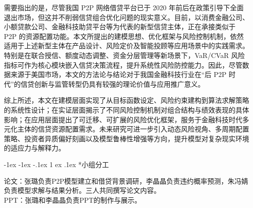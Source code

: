 \documentclass{write_paper}
\makeatletter
\renewcommand\section{\@startsection {section}{1}{\z@}%
                                   {-1ex \@plus -1ex \@minus -.1ex}%
                                   {1 ex \@plus.1ex}%
                                   {\normalfont\large\bfseries}}
\makeatother
\begin{document}
需要指出的是，尽管我国 P2P 网络借贷平台已于 2020 年前后在政策引导下全面退出市场，但这并不削弱信贷组合优化问题的现实意义。目前，以消费金融公司、小额贷款公司、金融科技助贷平台等为代表的新型信贷主体，正在承接类似于 P2P 的资源配置功能。本文所提出的建模思想、优化框架与风险控制机制，依然适用于上述新型主体在产品设计、风险定价及智能投顾等应用场景中的实践需求。特别是在联合授信、额度动态调整、资金分层管理等新场景下，VaR/CVaR 风险指标可作为核心模块嵌入信贷决策流程，提升系统性风险防控能力。因此，尽管数据来源于美国市场，本文的方法论与结论对于我国金融科技行业在“后 P2P 时代”的信贷创新与监管转型仍具有较强的理论价值与应用推广意义。

综上所述，本文在建模层面实现了从目标函数设定、风险约束建构到算法求解策略的系统性设计；在实证层面揭示了不同风险控制机制对组合结构与绩效表现的具体影响；在应用层面提出了可迁移、可扩展的风险优化框架，服务于金融科技时代多元化主体的信贷资源配置需求。未来研究可进一步引入动态风险视角、多周期配置策略、投资者异质偏好刻画以及模型鲁棒性增强等方向，提升模型对复杂现实环境的适应力与解释力。


 
\section*{小组分工}%
论文：张璐负责P2P模型建立和借贷背景调研，李晶晶负责违约概率预测，朱冯婧负责模型求解与结果分析。三人共同撰写论文内容。\\
PPT：张璐和李晶晶负责PPT的制作与展示。
 


\end{document}
